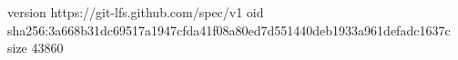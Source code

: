 version https://git-lfs.github.com/spec/v1
oid sha256:3a668b31dc69517a1947cfda41f08a80ed7d551440deb1933a961defadc1637c
size 43860

